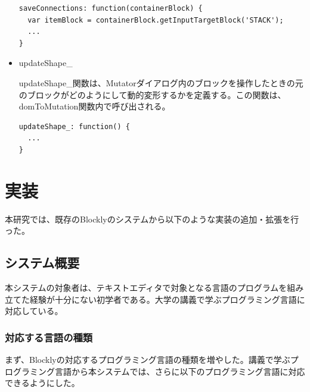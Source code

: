 \documentclass{risepaper}
\begin{document}
\begin{itemize}
\begin{lstlisting}[basicstyle=\ttfamily\footnotesize]
saveConnections: function(containerBlock) {
  var itemBlock = containerBlock.getInputTargetBlock('STACK');
  ...
}
\end{lstlisting}

\item updateShape\_

updateShape\_関数は、Mutatorダイアログ内のブロックを操作したときの元のブロックがどのようにして動的変形するかを定義する。この関数は、domToMutation関数内で呼び出される。

\begin{lstlisting}[basicstyle=\ttfamily\footnotesize]
updateShape_: function() {
  ...    
}
\end{lstlisting}

\end{itemize} 

   \chapter{実装}
   
本研究では、既存のBlocklyのシステムから以下のような実装の追加・拡張を行った。
    
   \section{システム概要}

本システムの対象者は、テキストエディタで対象となる言語のプログラムを組み立てた経験が十分にない初学者である。大学の講義で学ぶプログラミング言語に対応している。
   
   \subsection{対応する言語の種類}
   
まず、Blocklyの対応するプログラミング言語の種類を増やした。講義で学ぶプログラミング言語から本システムでは、さらに以下のプログラミング言語に対応できるようにした。
\end{document}
